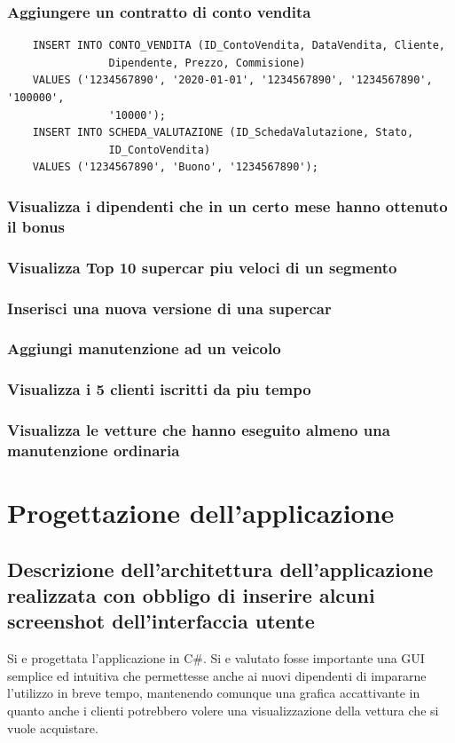 \documentclass[12pt]{article}
\begin{document}
\subsubsection*{Aggiungere un contratto di conto vendita}
\begin{lstlisting}
    INSERT INTO CONTO_VENDITA (ID_ContoVendita, DataVendita, Cliente, 
                Dipendente, Prezzo, Commisione)
    VALUES ('1234567890', '2020-01-01', '1234567890', '1234567890', '100000', 
                '10000');
    INSERT INTO SCHEDA_VALUTAZIONE (ID_SchedaValutazione, Stato, 
                ID_ContoVendita)
    VALUES ('1234567890', 'Buono', '1234567890');
\end{lstlisting}

\subsubsection*{Visualizza i dipendenti che in un certo mese hanno
ottenuto il bonus}

\subsubsection*{Visualizza Top 10 supercar piu veloci di un segmento}

\subsubsection*{Inserisci una nuova versione di una supercar}

\subsubsection*{Aggiungi manutenzione ad un veicolo}

\subsubsection*{Visualizza i 5 clienti iscritti da piu tempo}

\subsubsection*{Visualizza le vetture che hanno eseguito almeno una
manutenzione ordinaria}

\section{Progettazione dell'applicazione}

\subsection{Descrizione dell'architettura dell'applicazione
realizzata con obbligo di inserire alcuni screenshot dell'interfaccia utente}

Si e progettata l'applicazione in C\#. Si e valutato fosse importante una GUI
semplice ed intuitiva che permettesse anche ai nuovi dipendenti di impararne
l'utilizzo in breve tempo, mantenendo comunque una grafica accattivante in
quanto anche i clienti potrebbero volere una visualizzazione della vettura che
si vuole acquistare.
\end{document}
